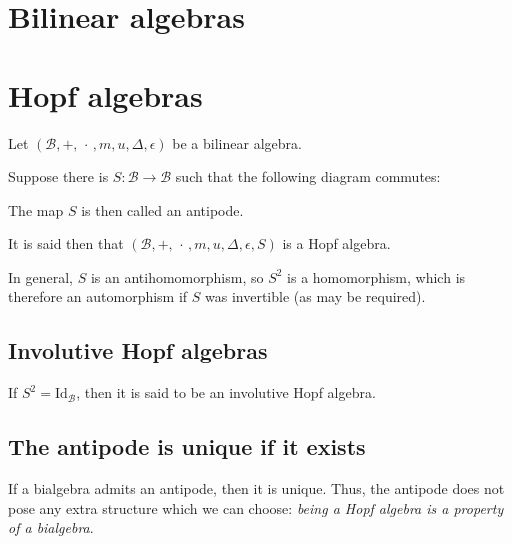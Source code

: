 \documentclass[12pt, a4paper, oneside]{amsproc}
\begin{document}
\section{Bilinear algebras}

\section{Hopf algebras}

Let $(\mathcal B,+,\,\cdot\,,m,u,\Delta,\epsilon)$ be a bilinear algebra.

Suppose there is $S:\mathcal B\to\mathcal B$ such that the following diagram commutes:

\begin{center}
\end{center}

The map $S$ is then called an antipode.

It is said then that $(\mathcal B,+,\,\cdot\,,m,u,\Delta,\epsilon,S)$ is a Hopf algebra.


In general, $S$ is an antihomomorphism, so $S^2$ is a homomorphism, which is therefore an automorphism if $S$ was invertible (as may be required). 

\subsection*{Involutive Hopf algebras}
If $S^2 = \mathrm{Id}_{\mathcal B}$, then it is said to be an involutive Hopf algebra.

\subsection*{The antipode is unique if it exists}

If a bialgebra admits an antipode, then it is unique. Thus, the antipode does not pose
any extra structure which we can choose: \emph{being a Hopf algebra is a property of a bialgebra}.
\end{document}
